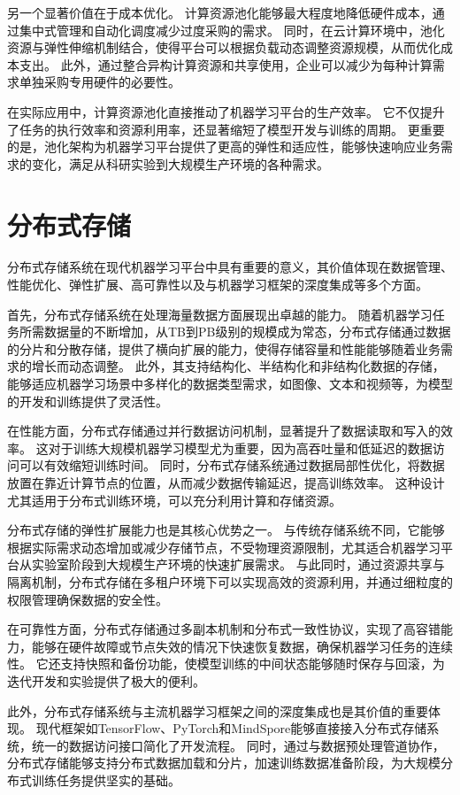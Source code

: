 另一个显著价值在于成本优化。
计算资源池化能够最大程度地降低硬件成本，通过集中式管理和自动化调度减少过度采购的需求。
同时，在云计算环境中，池化资源与弹性伸缩机制结合，使得平台可以根据负载动态调整资源规模，从而优化成本支出。
此外，通过整合异构计算资源和共享使用，企业可以减少为每种计算需求单独采购专用硬件的必要性。

在实际应用中，计算资源池化直接推动了机器学习平台的生产效率。
它不仅提升了任务的执行效率和资源利用率，还显著缩短了模型开发与训练的周期。
更重要的是，池化架构为机器学习平台提供了更高的弹性和适应性，能够快速响应业务需求的变化，满足从科研实验到大规模生产环境的各种需求。


\section{分布式存储}

分布式存储系统在现代机器学习平台中具有重要的意义，其价值体现在数据管理、性能优化、弹性扩展、高可靠性以及与机器学习框架的深度集成等多个方面。

首先，分布式存储系统在处理海量数据方面展现出卓越的能力。
随着机器学习任务所需数据量的不断增加，从TB到PB级别的规模成为常态，分布式存储通过数据的分片和分散存储，提供了横向扩展的能力，使得存储容量和性能能够随着业务需求的增长而动态调整。
此外，其支持结构化、半结构化和非结构化数据的存储，能够适应机器学习场景中多样化的数据类型需求，如图像、文本和视频等，为模型的开发和训练提供了灵活性。

在性能方面，分布式存储通过并行数据访问机制，显著提升了数据读取和写入的效率。
这对于训练大规模机器学习模型尤为重要，因为高吞吐量和低延迟的数据访问可以有效缩短训练时间。
同时，分布式存储系统通过数据局部性优化，将数据放置在靠近计算节点的位置，从而减少数据传输延迟，提高训练效率。
这种设计尤其适用于分布式训练环境，可以充分利用计算和存储资源。

分布式存储的弹性扩展能力也是其核心优势之一。
与传统存储系统不同，它能够根据实际需求动态增加或减少存储节点，不受物理资源限制，尤其适合机器学习平台从实验室阶段到大规模生产环境的快速扩展需求。
与此同时，通过资源共享与隔离机制，分布式存储在多租户环境下可以实现高效的资源利用，并通过细粒度的权限管理确保数据的安全性。

在可靠性方面，分布式存储通过多副本机制和分布式一致性协议，实现了高容错能力，能够在硬件故障或节点失效的情况下快速恢复数据，确保机器学习任务的连续性。
它还支持快照和备份功能，使模型训练的中间状态能够随时保存与回滚，为迭代开发和实验提供了极大的便利。

此外，分布式存储系统与主流机器学习框架之间的深度集成也是其价值的重要体现。
现代框架如TensorFlow、PyTorch和MindSpore能够直接接入分布式存储系统，统一的数据访问接口简化了开发流程。
同时，通过与数据预处理管道协作，分布式存储能够支持分布式数据加载和分片，加速训练数据准备阶段，为大规模分布式训练任务提供坚实的基础。

